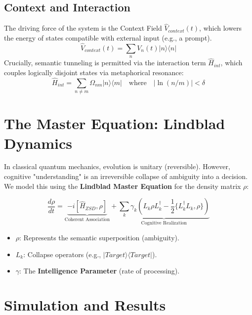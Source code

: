 \documentclass[11pt, a4paper]{article}
\begin{document}
\subsection{Context and Interaction}
The driving force of the system is the Context Field $\hat{V}_{context}(t)$, which lowers the energy of states compatible with external input (e.g., a prompt). 
\begin{equation}
    \hat{V}_{context}(t) = \sum_n V_n(t) |n\rangle\langle n|
\end{equation}
Crucially, semantic tunneling is permitted via the interaction term $\hat{H}_{int}$, which couples logically disjoint states via metaphorical resonance:
\begin{equation}
    \hat{H}_{int} = \sum_{n \neq m} \Omega_{nm} |n\rangle\langle m| \quad \text{where} \quad |\ln(n/m)| < \delta
\end{equation}

\section{The Master Equation: Lindblad Dynamics}

In classical quantum mechanics, evolution is unitary (reversible). However, cognitive "understanding" is an irreversible collapse of ambiguity into a decision. We model this using the \textbf{Lindblad Master Equation} for the density matrix $\rho$:

\begin{equation}
    \frac{d\rho}{dt} = \underbrace{-i[\hat{H}_{ZSD}, \rho]}_{\text{Coherent Association}} + \underbrace{\sum_k \gamma_k \left( L_k \rho L_k^\dagger - \frac{1}{2} \{L_k^\dagger L_k, \rho\} \right)}_{\text{Cognitive Realization}}
\end{equation}

\begin{itemize}
    \item $\rho$: Represents the semantic superposition (ambiguity).
    \item $L_k$: Collapse operators (e.g., $|Target\rangle\langle Target|$).
    \item $\gamma$: The \textbf{Intelligence Parameter} (rate of processing).
\end{itemize}

\section{Simulation and Results}
\end{document}
